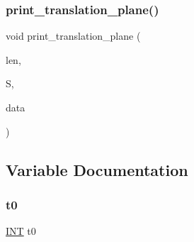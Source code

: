 \subsubsection{\texorpdfstring{print\+\_\+translation\+\_\+plane()}{print\_translation\_plane()}}
{\footnotesize\ttfamily void print\+\_\+translation\+\_\+plane (\begin{DoxyParamCaption}\item[{\mbox{\hyperlink{galois_8h_a09fddde158a3a20bd2dcadb609de11dc}{I\+NT}}}]{len,  }\item[{\mbox{\hyperlink{galois_8h_a09fddde158a3a20bd2dcadb609de11dc}{I\+NT}} $\ast$}]{S,  }\item[{void $\ast$}]{data }\end{DoxyParamCaption})}



\subsection{Variable Documentation}
\mbox{\label{translation__plane__main_8_c_a4268f4fe222ffb119218a0199f5e1904}} 
\subsubsection{\texorpdfstring{t0}{t0}}
{\footnotesize\ttfamily \mbox{\hyperlink{galois_8h_a09fddde158a3a20bd2dcadb609de11dc}{I\+NT}} t0}

